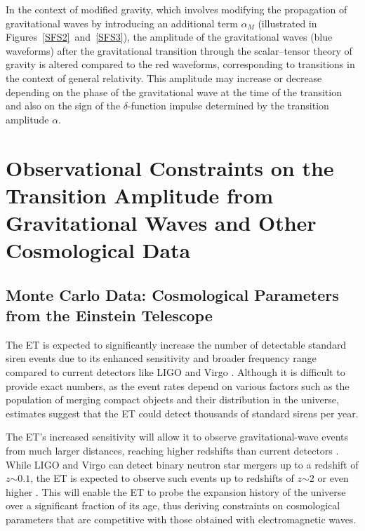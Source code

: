 \documentclass[universe,article,accept,moreauthors,pdftex]{Definitions/mdpi}
\begin{document}
  

In the context of modified gravity, which involves modifying the propagation of gravitational waves by introducing an additional term $\alpha_{M}$ \cite{Gleyzes:2014rba,Nishizawa_2018} (illustrated in \mbox{Figures \ref{SFS2} and \ref{SFS3}}), the amplitude of the gravitational waves (blue waveforms) after the gravitational transition through the scalar--tensor theory of gravity is altered compared to the red waveforms, corresponding to transitions in the context of general relativity. This amplitude may increase or decrease depending on the phase of the gravitational wave at the time of the transition and also on the sign of the $\delta$-function impulse determined by the transition amplitude $\alpha$.

\section{Observational Constraints on the Transition Amplitude from Gravitational Waves and Other Cosmological Data}\label{sec:III}


\subsection{Monte Carlo Data: Cosmological Parameters from the Einstein Telescope}\label{subsec:3.1}

The ET \cite{Punturo:2010zz,Sathyaprakash:2012jk,Maggiore:2019uih} is expected to significantly increase the number of detectable standard siren events due to its enhanced sensitivity and broader frequency range compared to current detectors like LIGO \cite{LIGOScientific:2014pky} and Virgo \cite{VIRGO:2014yos}. Although it is difficult to provide exact numbers, as the event rates depend on various factors such as the population of merging compact objects and their distribution in the universe, estimates suggest that the ET could detect thousands of standard sirens per year.

The ET's increased sensitivity will allow it to observe gravitational-wave events from much larger distances, reaching higher redshifts than current detectors \cite{Cai:2017aea,Yang:2023qqz,Fu:2019oll,Cai:2021ooo,Mukherjee:2020mha,LISACosmologyWorkingGroup:2022jok}. While LIGO and Virgo can detect binary neutron star mergers up to a redshift of $z$$\sim$$0.1$, the ET is expected to observe such events up to redshifts of $z$$\sim$$2$ or even higher \cite{LIGOScientific:2016wof,Maggiore:2019uih}. This will enable the ET to probe the expansion history of the universe over a significant fraction of its age, thus deriving constraints on cosmological parameters that are competitive with those obtained with electromagnetic waves.
\end{document}
